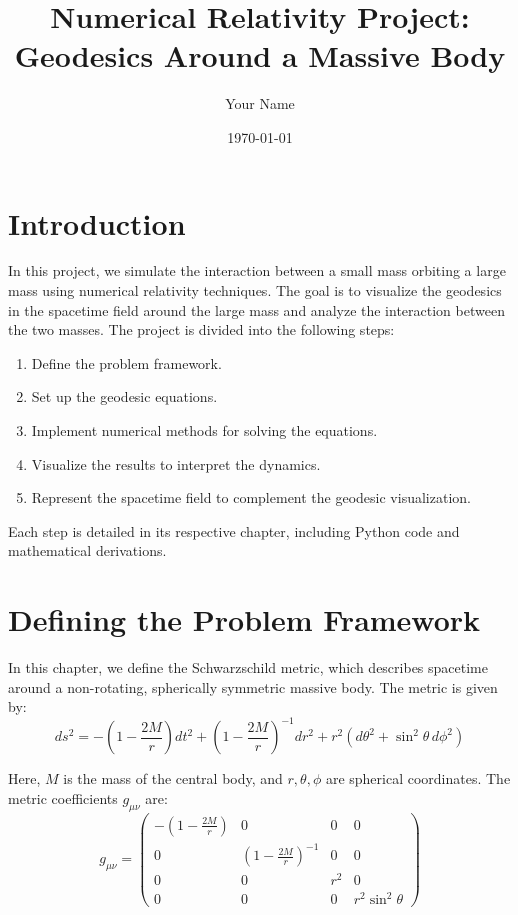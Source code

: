 \documentclass[12pt]{article}
\title{Numerical Relativity Project: Geodesics Around a Massive Body}
\author{Your Name}
\date{\today}
\begin{document}
\maketitle

\tableofcontents

\newpage

\section*{Introduction}

In this project, we simulate the interaction between a small mass orbiting a large mass using numerical relativity techniques. The goal is to visualize the geodesics in the spacetime field around the large mass and analyze the interaction between the two masses. The project is divided into the following steps:
\begin{enumerate}
    \item Define the problem framework.
    \item Set up the geodesic equations.
    \item Implement numerical methods for solving the equations.
    \item Visualize the results to interpret the dynamics.
    \item Represent the spacetime field to complement the geodesic visualization.
\end{enumerate}

Each step is detailed in its respective chapter, including Python code and mathematical derivations.


\section{Defining the Problem Framework}

In this chapter, we define the Schwarzschild metric, which describes spacetime around a non-rotating, spherically symmetric massive body. The metric is given by:
\[
ds^2 = -\left(1 - \frac{2M}{r}\right)dt^2 + \left(1 - \frac{2M}{r}\right)^{-1}dr^2 + r^2 \left(d\theta^2 + \sin^2\theta \, d\phi^2 \right)
\]

Here, \(M\) is the mass of the central body, and \(r, \theta, \phi\) are spherical coordinates. The metric coefficients \(g_{\mu\nu}\) are:
\[
g_{\mu\nu} = 
\begin{pmatrix}
-\left(1 - \frac{2M}{r}\right) & 0 & 0 & 0 \\
0 & \left(1 - \frac{2M}{r}\right)^{-1} & 0 & 0 \\
0 & 0 & r^2 & 0 \\
0 & 0 & 0 & r^2 \sin^2\theta
\end{pmatrix}
\]
\end{document}
